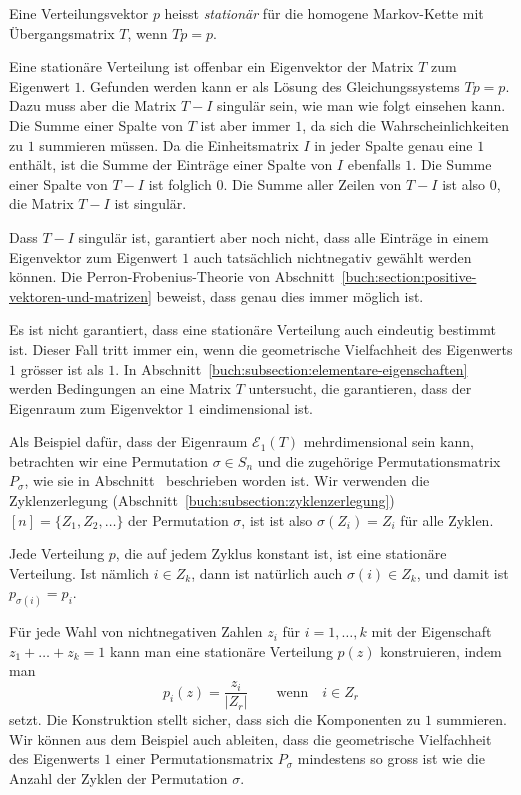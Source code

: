 \begin{definition}
Eine Verteilungsvektor $p$ heisst {\em stationär} für die
homogene Markov-Kette mit Übergangsmatrix $T$, wenn $Tp=p$.
%
\end{definition}

Eine stationäre Verteilung ist offenbar ein Eigenvektor der Matrix
$T$ zum Eigenwert $1$.
Gefunden werden kann er als Lösung des Gleichungssystems $Tp=p$.
Dazu muss aber die Matrix $T-I$ singulär sein, wie man wie folgt
einsehen kann.
Die Summe einer Spalte von $T$ ist aber immer $1$, da sich die
Wahrscheinlichkeiten zu $1$ summieren müssen.
Da die Einheitsmatrix $I$ in jeder Spalte
genau eine $1$ enthält, ist die Summe der Einträge einer Spalte von
$I$ ebenfalls $1$.
Die Summe einer Spalte von $T-I$ ist folglich $0$.
Die Summe aller Zeilen von $T-I$ ist also $0$, die Matrix $T-I$ 
ist singulär.

Dass $T-I$ singulär ist, garantiert aber noch nicht,
dass alle Einträge in einem Eigenvektor zum Eigenwert $1$
auch tatsächlich nichtnegativ gewählt werden können.
Die Perron-Frobenius-Theorie von
%
Abschnitt~\ref{buch:section:positive-vektoren-und-matrizen}
beweist, dass genau dies immer möglich ist.

Es ist nicht garantiert, dass eine stationäre Verteilung
auch eindeutig bestimmt ist.
Dieser Fall tritt immer ein, wenn die geometrische Vielfachheit
des Eigenwerts $1$ grösser ist als $1$.
In Abschnitt~\ref{buch:subsection:elementare-eigenschaften}
werden Bedingungen an eine Matrix $T$ untersucht, die garantieren,
dass der Eigenraum zum Eigenvektor $1$ eindimensional ist.

\begin{beispiel}
Als Beispiel dafür, dass der Eigenraum $\mathcal{E}_1(T)$
mehrdimensional sein kann, betrachten wir eine Permutation $\sigma\in S_n$
%
und die zugehörige Permutationsmatrix $P_\sigma$,
%
wie sie in Abschnitt~\label{buch:section:permutationsmatrizen}
beschrieben worden ist.
Wir verwenden die 
Zyklenzerlegung (Abschnitt~\ref{buch:subsection:zyklenzerlegung})
\(
[n] = \{ Z_1, Z_2,\dots \}
\)
der Permutation $\sigma$, ist ist also $\sigma(Z_i) = Z_i$ für alle
Zyklen.

Jede Verteilung $p$, die auf jedem Zyklus konstant ist, ist eine
stationäre Verteilung.
Ist nämlich $i\in Z_k$, dann ist natürlich auch $\sigma(i)\in Z_k$,
und damit ist $p_{\sigma(i)}=p_i$.

Für jede Wahl von nichtnegativen Zahlen $z_i$ für $i=1,\dots,k$
mit der Eigenschaft $z_1+\dots+z_k=1$ kann man eine stationäre
Verteilung $p(z)$ konstruieren, indem man
\[
p_i(z)
=
\frac{z_i}{|Z_r|}
\qquad\text{wenn}\quad i\in Z_r
\]
setzt.
Die Konstruktion stellt sicher, dass sich die Komponenten zu $1$
summieren.
Wir können aus dem Beispiel auch ableiten, dass die geometrische
Vielfachheit des Eigenwerts $1$ einer Permutationsmatrix $P_\sigma$ 
mindestens so gross ist wie die
Anzahl der Zyklen der Permutation $\sigma$.
\end{beispiel}

